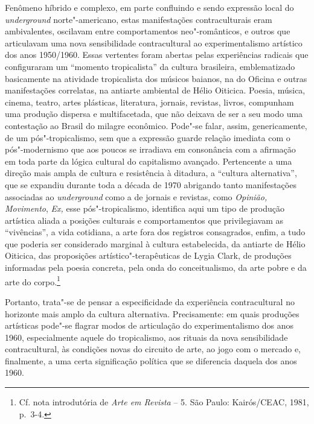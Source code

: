 Fenômeno híbrido e complexo, em parte confluindo e sendo expressão local
do \emph{underground} norte"-americano, estas manifestações
contraculturais eram ambivalentes, oscilavam entre comportamentos
neo"-românticos, e outros que articulavam uma nova sensibilidade
contracultural ao experimentalismo artístico dos anos 1950/1960. Essas
vertentes foram abertas pelas experiências radicais que configuraram um
``momento tropicalista'' da cultura brasileira, emblematizado
basicamente na atividade tropicalista dos músicos baianos, na do Oficina
e outras manifestações correlatas, na antiarte ambiental de Hélio
Oiticica. Poesia, música, cinema, teatro, artes plásticas, literatura,
jornais, revistas, livros, compunham uma produção dispersa e
multifacetada, que não deixava de ser a seu modo uma contestação ao
Brasil do milagre econômico. Pode"-se falar, assim, genericamente, de um
pós"-tropicalismo, sem que a expressão guarde relação imediata com o
pós"-modernismo que aos poucos se irradiava em consonância com a
afirmação em toda parte da lógica cultural do capitalismo avançado.
Pertencente a uma direção mais ampla de cultura e resistência à
ditadura, a ``cultura alternativa'', que se expandiu durante toda a
década de 1970 abrigando tanto manifestações associadas ao
\emph{underground} como a de jornais e revistas, como \emph{Opinião,
Movimento}, \emph{Ex,} esse pós"-tropicalismo, identifica aqui um tipo de
produção artística aliada a posições culturais e comportamentos que
privilegiavam as ``vivências'', a vida cotidiana, a arte fora dos
registros consagrados, enfim, a tudo que poderia ser considerado
marginal à cultura estabelecida, da antiarte de Hélio Oiticica, das
proposições artístico"-terapêuticas de Lygia Clark, de produções
informadas pela poesia concreta, pela onda do conceitualismo, da arte
pobre e da arte do corpo.\footnote{Cf. nota introdutória de \emph{Arte
  em Revista} -- 5. São Paulo: Kairós/\textsc{CEAC}, 1981, p.~3-4.}

Portanto, trata"-se de pensar a especificidade da experiência
contracultural no horizonte mais amplo da cultura alternativa.
Precisamente: em quais produções artísticas pode"-se flagrar modos de
articulação do experimentalismo dos anos 1960, especialmente aquele do
tropicalismo, aos rituais da nova sensibilidade contracultural, às
condições novas do circuito de arte, ao jogo com o mercado e,
finalmente, a uma certa significação política que se diferencia daquela
dos anos 1960.


